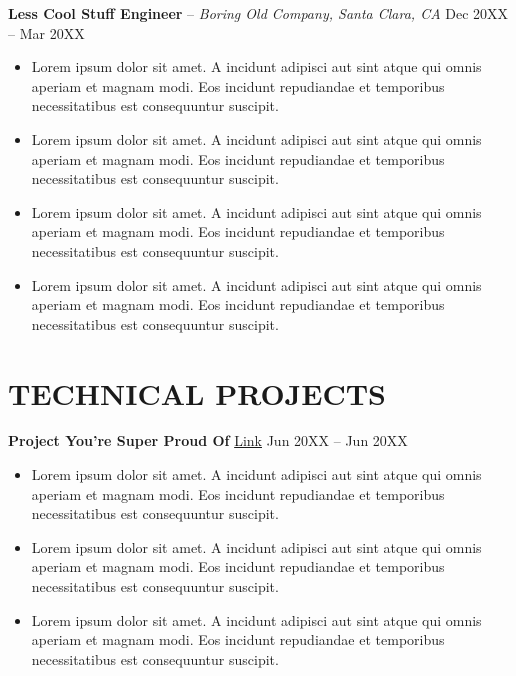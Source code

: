 \documentclass[10pt,letterpaper]{extarticle}
\begin{document}
\textbf{Less Cool Stuff Engineer} -- \textit{Boring Old Company, Santa Clara, CA} \hfill Dec 20XX -- Mar 20XX %
\begin{itemize}[leftmargin=*, nosep]
    \item Lorem ipsum dolor sit amet. A incidunt adipisci aut sint atque qui omnis aperiam et magnam modi. Eos incidunt repudiandae et temporibus necessitatibus est consequuntur suscipit. %
    \item Lorem ipsum dolor sit amet. A incidunt adipisci aut sint atque qui omnis aperiam et magnam modi. Eos incidunt repudiandae et temporibus necessitatibus est consequuntur suscipit. %
    \item Lorem ipsum dolor sit amet. A incidunt adipisci aut sint atque qui omnis aperiam et magnam modi. Eos incidunt repudiandae et temporibus necessitatibus est consequuntur suscipit. %
    \item Lorem ipsum dolor sit amet. A incidunt adipisci aut sint atque qui omnis aperiam et magnam modi. Eos incidunt repudiandae et temporibus necessitatibus est consequuntur suscipit. %
\end{itemize}

\section*{TECHNICAL PROJECTS}
\textbf{Project You're Super Proud Of} \href{https://github.com/}{Link} \hfill Jun 20XX -- Jun 20XX %
\begin{itemize}[leftmargin=*, nosep]
    \item Lorem ipsum dolor sit amet. A incidunt adipisci aut sint atque qui omnis aperiam et magnam modi. Eos incidunt repudiandae et temporibus necessitatibus est consequuntur suscipit. %
    \item Lorem ipsum dolor sit amet. A incidunt adipisci aut sint atque qui omnis aperiam et magnam modi. Eos incidunt repudiandae et temporibus necessitatibus est consequuntur suscipit. %
    \item Lorem ipsum dolor sit amet. A incidunt adipisci aut sint atque qui omnis aperiam et magnam modi. Eos incidunt repudiandae et temporibus necessitatibus est consequuntur suscipit. %
\end{itemize}
\vspace{2pt}
\end{document}

